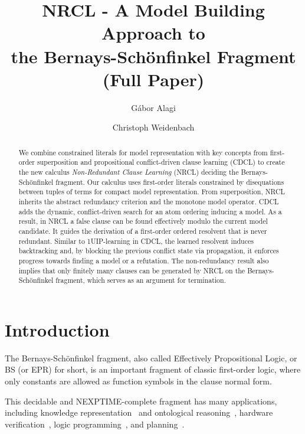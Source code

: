 \documentclass[a4paper]{article}
\newcommand{\mEPR}{Bernays-Sch\"onfinkel}
\begin{document}
\title{NRCL - A Model Building Approach to\\ the {\mEPR} Fragment\\ (Full Paper)}
\setcounter{Maxaffil}{3}
\author[1,2,3]{G\'abor Alagi}
\author[3]{Christoph Weidenbach}

\date{}

\clearpage

\maketitle

\begin{abstract}
We combine constrained literals for model representation 
with key concepts from first-order superposition
and propositional conflict-driven clause learning (CDCL)
to create the new calculus \emph{Non-Redundant Clause Learning} 
(NRCL) deciding the {\mEPR} fragment. 
Our calculus uses first-order literals constrained by disequations between tuples of terms 
for compact model representation.
From superposition, NRCL inherits the abstract redundancy criterion and 
the monotone model operator.
CDCL adds the dynamic, conflict-driven search for an 
atom ordering inducing a model. 
As a result, in NRCL a false clause can
be found effectively modulo the current model candidate. It guides
the derivation of a first-order ordered resolvent that is never redundant.
Similar to 1UIP-learning in CDCL, the learned resolvent induces
backtracking and, by blocking the previous conflict state via propagation, 
it enforces progress towards finding a model or a refutation.
The non-redundancy result also implies that only finitely many clauses
can be generated by NRCL on the {\mEPR} fragment, which 
serves as an argument for termination.
\end{abstract}
\section{Introduction}
The {\mEPR} fragment, also called Effectively Propositional Logic, or BS (or EPR) for short, 
is an important fragment of classic first-order logic, where only constants are allowed as
function symbols in the clause normal form. 

This decidable and NEXPTIME-complete fragment has many applications,
including knowledge representation~\cite{HustadtMS04} and ontological reasoning~\cite{SudaWeidenbachWischnewskiIJCAR10},
hardware verification~\cite{KhasidashviliKV09}\cite{PerezV07}\cite{EmmerKKV10}, logic programming~\cite{EiterFT05}, and planning~\cite{PerezV13}.
\end{document}
